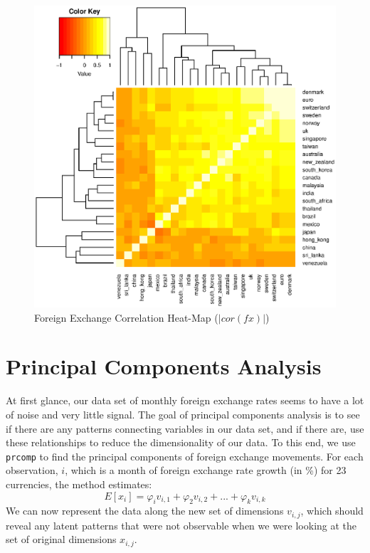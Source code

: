 \documentclass[11pt, fleqn]{article}
\begin{document}
\begin{figure}[!htb]
  \centering
  \includegraphics[scale=.5]{heatmap.eps}
  \caption{Foreign Exchange Correlation Heat-Map ($|cor(fx)|$)}
  \label{fig:heatmap}
\end{figure} 

\section{Principal Components Analysis} \label{sec:pca}

At first glance, our data set of monthly foreign exchange rates seems to have a lot of noise and very little signal. The goal of principal components analysis is to see if there are any patterns connecting variables in our data set, and if there are, use these relationships to reduce the dimensionality of our data. To this end, we use \texttt{prcomp} to find the principal components of foreign exchange movements. For each observation, $i$, which is a month of foreign exchange rate growth (in \%) for 23 currencies, the method estimates:
\begin{equation}
E[x_i] = \varphi_i v_{i,1} + \varphi_2 v_{i,2} + ... + \varphi_k v_{i,k}
\end{equation}
We can now represent the data along the new set of dimensions $v_{i,j}$, which should reveal any latent patterns that were not observable when we were looking at the set of original dimensions $x_{i,j}$.
\end{document}
